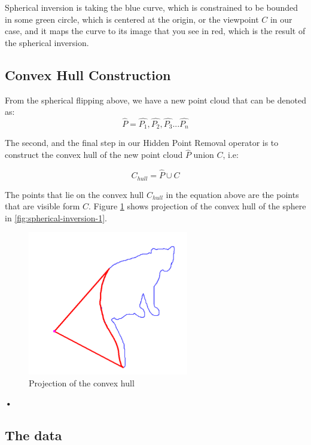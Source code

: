 \documentclass[11pt]{article}
\begin{document}
Spherical inversion is taking the blue curve, which is constrained to be bounded in some green circle, which is centered at the origin, or the viewpoint $C$ in our case, and it maps the curve to its image that you see in red, which is the result of the spherical inversion.

\subsection{Convex Hull Construction}
From the spherical flipping above, we have a new point cloud that can be denoted as:
\begin{equation}
\label{eq:3}
\widehat{P} = \hat{P_{1}},\hat{P_{2}},\hat{P_{3}} ... \hat{P_{n}}
\end{equation}

The second, and the final step in our Hidden Point Removal operator is to construct the  convex hull of the new point cloud $\widehat{P} $ union $C$, i.e:

\begin{equation}
C_{hull} = \widehat{P} \cup C
\end{equation}

The points that lie on the convex hull $C_{hull}$ in the equation above  are the points that are visible form $ C $. Figure \ref{fig:spherical-inversion-2} shows projection of the convex hull of the sphere in \ref{fig:spherical-inversion-1}.

\begin{figure}[h]
\includegraphics[width=7cm]{spherical-inversion-2}
\centering
\caption{Projection of the convex hull}
\label{fig:spherical-inversion-2}
\end{figure}\textbf{•}

\subsection{The data}
\end{document}
